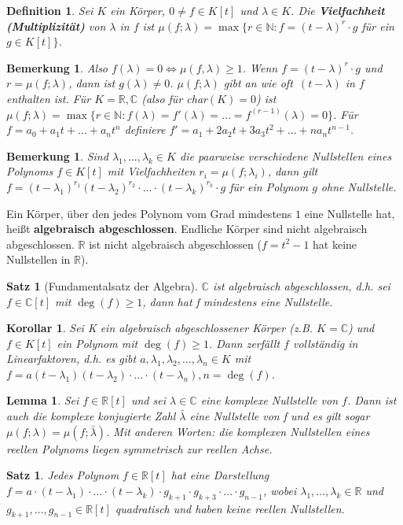 \documentclass[12pt,a4paper]{article}
\theoremstyle{plain}
\newtheorem{Satz}[Theorem]{Satz}
\newtheorem{Lemma}[Theorem]{Lemma}
\newtheorem{Korollar}[Theorem]{Korollar}
\newtheorem{Definition}[Theorem]{Definition}
\newtheorem{Bemerkung}[Theorem]{Bemerkung}
\newcommand{\herv}[1]{{\emph{\textbf{#1}}}}
\newcommand{\N}{\mathbb{N}}
\newcommand{\R}{\mathbb{R}}
\newcommand{\C}{\mathbb{C}}
\numberwithin{equation}{section}
\begin{document}
\begin{Definition}
Sei $K$ ein Körper, $0\neq f\in K[t]$ und $\lambda\in K$. Die \herv{Vielfachheit (Multiplizität)} von $\lambda$ in $f$ ist $\mu(f;\lambda)=\max\{r\in\N:f=(t-\lambda)^r\cdot g$ für ein $g\in K[t]\}$.
\end{Definition}
\begin{Bemerkung}
Also $f(\lambda)=0\Leftrightarrow \mu(f,\lambda)\geq 1$. Wenn $f=(t-\lambda)^r\cdot g$ und $r=\mu(f;\lambda)$, dann ist $g(\lambda)\neq 0$. $\mu(f;\lambda)$ gibt an \glqq wie oft\grqq\ $(t-\lambda)$ in $f$ enthalten ist.
Für $K=\R,\C$ (also für char$(K)=0$) ist $\mu(f;\lambda)=\max\{r\in \N: f(\lambda)=f'(\lambda)=\ldots=f^{(r-1)}(\lambda)=0\}$. Für $f=a_0+a_1t+\ldots+a_nt^n$ definiere $f'=a_1+2a_2t+3a_3t^2+\ldots+na_nt^{n-1}$.\end{Bemerkung}
\begin{Bemerkung}
Sind $\lambda_1,\ldots,\lambda_k\in K$ die paarweise verschiedene Nullstellen eines Polynoms $f\in K[t]$ mit Vielfachheiten $r_i=\mu(f;\lambda_i)$, dann gilt $f=(t-\lambda_1)^{r_1}(t-\lambda_2)^{r_2}\cdot\ldots\cdot(t-\lambda_k)^{r_k}\cdot g$ für ein Polynom $g$ ohne Nullstelle.
\end{Bemerkung}
Ein Körper, über den jedes Polynom vom Grad mindestens $1$ eine Nullstelle hat, heißt \textbf{algebraisch abgeschlossen}. Endliche Körper sind nicht algebraisch abgeschlossen. $\R$ ist nicht algebraisch abgeschlossen ($f=t^2-1$ hat keine Nullstellen in $\R$).
\begin{Satz}[Fundamentalsatz der Algebra]
$\C$ ist algebraisch abgeschlossen, d.h. sei $f\in \C[t]$ mit $\deg(f)\geq 1$, dann hat f mindestens eine Nullstelle.
\end{Satz}
\begin{Korollar}
Sei K ein algebraisch abgeschlossener Körper (z.B. $K=\C$) und $f\in K[t]$ ein Polynom mit $\deg(f)\geq 1$. Dann zerfällt $f$ vollständig in Linearfaktoren, d.h. es gibt $a,\lambda_1,\lambda_2,\ldots,\lambda_n\in K$ mit $f=a(t-\lambda_1)(t-\lambda_2)\cdot\ldots\cdot(t-\lambda_n), n=\deg(f)$.
\end{Korollar}
\begin{Lemma}
Sei $f\in\R[t]$ und sei $\lambda\in\C$ eine komplexe Nullstelle von $f$. Dann ist auch die komplexe konjugierte Zahl $\bar{\lambda}$ eine Nullstelle von f und es gilt sogar $\mu(f;\lambda)=\mu(f;\bar{\lambda})$. Mit anderen Worten: die komplexen Nullstellen eines reellen Polynoms liegen symmetrisch zur reellen Achse.
\end{Lemma}
\begin{Satz}
Jedes Polynom $f\in \R[t]$ hat eine Darstellung $f=a\cdot(t-\lambda_1)\cdot\ldots\cdot(t-\lambda_k)\cdot   g_{k+1}\cdot g_{k+3}\cdot\ldots\cdot g_{n-1}$, wobei $\lambda_1,\ldots,\lambda_k \in \R$ und $g_{k+1},\ldots,g_{n-1}\in \R[t]$ quadratisch und haben keine reellen Nullstellen.
\end{Satz}
\end{document}

